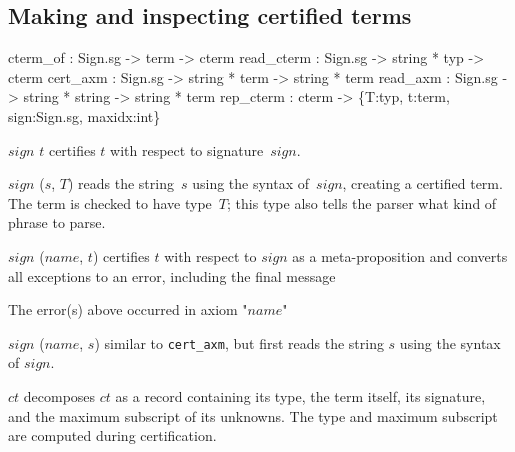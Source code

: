 \subsection{Making and inspecting certified terms}
\begin{ttbox}
cterm_of   : Sign.sg -> term -> cterm
read_cterm : Sign.sg -> string * typ -> cterm
cert_axm   : Sign.sg -> string * term -> string * term
read_axm   : Sign.sg -> string * string -> string * term
rep_cterm  : cterm -> \{T:typ, t:term, sign:Sign.sg, maxidx:int\}
\end{ttbox}
\begin{ttdescription}
\item[\ttindexbold{cterm_of} $sign$ $t$] 
certifies $t$ with respect to signature~$sign$.

\item[\ttindexbold{read_cterm} $sign$ ($s$, $T$)]
reads the string~$s$ using the syntax of~$sign$, creating a certified term.
The term is checked to have type~$T$; this type also tells the parser what
kind of phrase to parse.

\item[\ttindexbold{cert_axm} $sign$ ($name$, $t$)]
certifies $t$ with respect to $sign$ as a meta-proposition and converts all
exceptions to an error, including the final message
\begin{ttbox}
The error(s) above occurred in axiom "\(name\)"
\end{ttbox}

\item[\ttindexbold{read_axm} $sign$ ($name$, $s$)]
similar to {\tt cert_axm}, but first reads the string $s$ using the syntax of
$sign$.

\item[\ttindexbold{rep_cterm} $ct$]
decomposes $ct$ as a record containing its type, the term itself, its
signature, and the maximum subscript of its unknowns.  The type and maximum
subscript are computed during certification.
\end{ttdescription}


